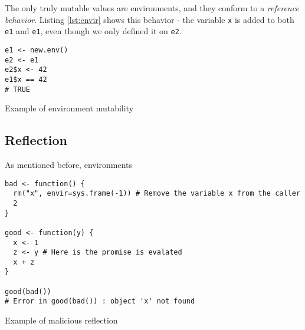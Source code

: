 The only truly mutable values are environments, and they conform to a \textit{reference behavior}. Listing \ref{lst:envir} shows this behavior - the variable \texttt{x} is added to both \texttt{e1} and \texttt{e1}, even though we only defined it on \texttt{e2}.

\begin{listing}
	\centering
	\begin{verbatim}
e1 <- new.env()
e2 <- e1
e2$x <- 42
e1$x == 42
# TRUE
  \end{verbatim}
	\caption{Example of environment mutability}\label{lst:envir}
\end{listing}

\subsection*{Reflection}

\todo{}
As mentioned before, environments

\begin{listing}
	\centering
	\begin{verbatim}
bad <- function() {
  rm("x", envir=sys.frame(-1)) # Remove the variable x from the caller
  2
}

good <- function(y) {
  x <- 1
  z <- y # Here is the promise is evalated
  x + z
}

good(bad())
# Error in good(bad()) : object 'x' not found
  \end{verbatim}
	\caption{Example of malicious reflection\todocite}\label{lst:bad-ref}
\end{listing}


%

